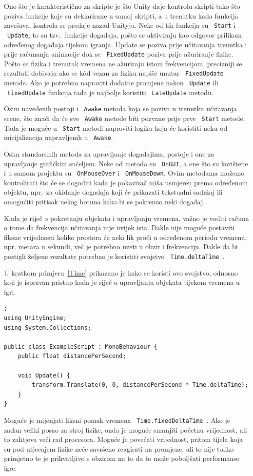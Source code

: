 Ono što je karakteristično za skripte je što Unity daje kontrolu skripti tako što poziva funkcije koje su deklarirane u samoj skripti, a u trenutku kada funkcija završava, kontrola se predaje nazad Unityju.  Neke od tih funkcija su ~\texttt{Start} i ~\texttt{Update}, to su tzv.~funkcije događaja, pošto se aktiviraju kao odgovor prilikom određenog događaja tijekom igranja. Update se poziva prije učitavanja trenutka i prije računanja animacije dok se ~\texttt{FixedUpdate} poziva prije ažuriranje fizike. Pošto se fizika i trenutak vremena ne ažuriraju istom frekvencijom, precizniji se rezultati dobivaju ako se k\^od vezan za fiziku napiše unutar ~\texttt{FixedUpdate} metode. Ako je potrebno napraviti dodatne promjene nakon ~\texttt{Update} ili ~\texttt{FixedUpdate} funkcija tada je najbolje koristiti ~\texttt{LateUpdate} metodu.

Osim navedenih postoji i ~\texttt{Awake} metoda koja se poziva u trenutku učitavanja scene, što znači da će sve ~\texttt{Awake} metode biti pozvane prije prve ~\texttt{Start} metode. Tada je moguće u ~\texttt{Start} metodi napraviti logiku koja će koristiti neku od inicijalizacija napravljenih u ~\texttt{Awake}.

Osim standardnih metoda za upravljanje događajima, postoje i one za upravljanje grafičkim sučeljem. Neke od metoda su ~\texttt{OnGUI}, a one što su korištene i u samom projektu su ~\texttt{OnMouseOver} i ~\texttt{OnMouseDown}. Ovim metodama možemo kontrolirati što će se dogoditi kada je pokazivač miša usmjeren prema određenom objektu, npr.~za okidanje događaja koji će prikazati tekstualni sadržaj ili omogućiti pritisak nekog botuna kako bi se pokrenuo neki događaj.

Kada je riječ o pokretanju objekata i upravljanju vremena, važno je voditi računa o tome da frekvencija učitavanja nije uvijek ista. Dakle nije moguće postaviti fiksne vrijednosti koliko prostora će neki lik proći u određenom periodu vremena, npr. metara u sekundi, već je potrebno uzeti u obzir i frekvenciju. Dakle da bi postigli željene rezultate potrebno je koristiti svojstvo \texttt{ Time.deltaTime }.

U kratkom primjeru~\ref{Time} prikazano je kako se koristi ovo svojstvo, odnosno koji je ispravan pristup kada je riječ o upravljanju objekata tijekom vremena u igri.
\begin{lstlisting}[caption={Upravljanje vremenom}, label=Time];
using UnityEngine;
using System.Collections;

public class ExampleScript : MonoBehaviour {
    public float distancePerSecond;
    
    void Update() {
        transform.Translate(0, 0, distancePerSecond * Time.deltaTime);
    }
}
\end{lstlisting}
Moguće je mijenjati fiksni pomak vremena \texttt{ Time.fixedDeltaTime }. Ako je zadan veliki posao za stroj fizike, onda je moguće smanjiti početnu vrijednost, ali to zahtjeva veći rad procesora. Moguće je povećati vrijednost, pritom tijela koja su pod utjecajem fizike neće savršeno reagirati na promjene, ali to nije toliko primjetno te je prihvatljivo s obzirom na to da to može poboljšati performanse igre.

